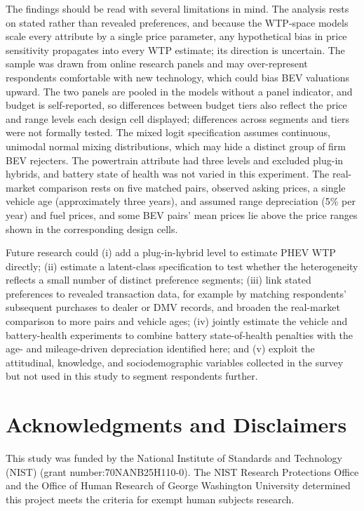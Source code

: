 \documentclass[a4paper,fleqn]{cas-sc}   %
\begin{document}
The findings should be read with several limitations in mind. The analysis rests on stated rather than revealed preferences, and because the WTP-space models scale every attribute by a single price parameter, any hypothetical bias in price sensitivity propagates into every WTP estimate; its direction is uncertain. The sample was drawn from online research panels and may over-represent respondents comfortable with new technology, which could bias BEV valuations upward. The two panels are pooled in the models without a panel indicator, and budget is self-reported, so differences between budget tiers also reflect the price and range levels each design cell displayed; differences across segments and tiers were not formally tested. The mixed logit specification assumes continuous, unimodal normal mixing distributions, which may hide a distinct group of firm BEV rejecters. The powertrain attribute had three levels and excluded plug-in hybrids, and battery state of health was not varied in this experiment. The real-market comparison rests on five matched pairs, observed asking prices, a single vehicle age (approximately three years), and assumed range depreciation (5\% per year) and fuel prices, and some BEV pairs' mean prices lie above the price ranges shown in the corresponding design cells.

Future research could (i) add a plug-in-hybrid level to estimate PHEV WTP directly; (ii) estimate a latent-class specification to test whether the heterogeneity reflects a small number of distinct preference segments; (iii) link stated preferences to revealed transaction data, for example by matching respondents' subsequent purchases to dealer or DMV records, and broaden the real-market comparison to more pairs and vehicle ages; (iv) jointly estimate the vehicle and battery-health experiments to combine battery state-of-health penalties with the age- and mileage-driven depreciation identified here; and (v) exploit the attitudinal, knowledge, and sociodemographic variables collected in the survey but not used in this study to segment respondents further.

\section*{Acknowledgments and Disclaimers}

This study was funded by the National Institute of Standards and Technology (NIST) (grant number:70NANB25H110-0). The NIST Research Protections Office and the Office of Human Research of George Washington University determined this project meets the criteria for exempt human subjects research.
\end{document}
